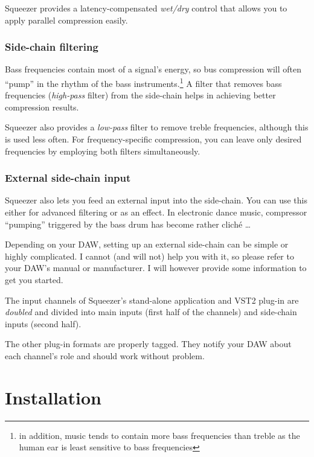 Squeezer provides a latency-compensated \emph{wet/dry} control that
allows you to apply parallel compression easily.

\subsection{Side-chain filtering}
\label{sec:side_chain_filtering}

Bass frequencies contain most of a signal's energy, so bus compression
will often ``pump'' in the rhythm of the bass instruments.\footnote{in
  addition, music tends to contain more bass frequencies than treble
  as the human ear is least sensitive to bass frequencies} A filter
that removes bass frequencies (\emph{high-pass} filter) from the
side-chain helps in achieving better compression results.

Squeezer also provides a \emph{low-pass} filter to remove treble
frequencies, although this is used less often.  For frequency-specific
compression, you can leave only desired frequencies by employing both
filters simultaneously.

\subsection{External side-chain input}
\label{sec:external_side_chain}

Squeezer also lets you feed an external input into the side-chain.
You can use this either for advanced filtering or as an effect.  In
electronic dance music, compressor ``pumping'' triggered by the bass
drum has become rather cliché \dots

Depending on your DAW, setting up an external side-chain can be simple
or highly complicated.  I cannot (and will not) help you with it, so
please refer to your DAW's manual or manufacturer.  I will however
provide some information to get you started.

The input channels of Squeezer's stand-alone application and VST2
plug-in are \emph{doubled} and divided into main inputs (first half of
the channels) and side-chain inputs (second half).

The other plug-in formats are properly tagged.  They notify your DAW
about each channel's role and should work without problem.

\chapter{Installation}
\label{chap:installation}

